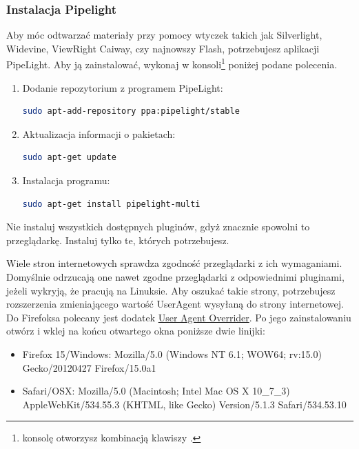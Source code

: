 \subsubsection{Instalacja Pipelight}
Aby móc odtwarzać materiały przy pomocy wtyczek takich jak Silverlight, Widevine, ViewRight Caiway, czy najnowszy Flash, potrzebujesz aplikacji PipeLight. Aby ją zainstalować, wykonaj w konsoli\footnote{konsolę otworzysz kombinacją klawiszy .} poniżej podane polecenia.
\begin{enumerate}
\item Dodanie repozytorium z programem PipeLight:
\begin{lstlisting}[language=bash]
sudo apt-add-repository ppa:pipelight/stable
\end{lstlisting}
\item Aktualizacja informacji o pakietach:
\begin{lstlisting}[language=bash]
sudo apt-get update
\end{lstlisting}
\item Instalacja programu:
\begin{lstlisting}[language=bash]
sudo apt-get install pipelight-multi
\end{lstlisting}
\end{enumerate}

\noindent Nie instaluj wszystkich dostępnych pluginów, gdyż znacznie spowolni to przeglądarkę. Instaluj tylko te, których potrzebujesz.

Wiele stron internetowych sprawdza zgodność przeglądarki z ich wymaganiami. Domyślnie odrzucają one nawet zgodne przeglądarki z odpowiednimi pluginami, jeżeli wykryją, że pracują na Linuksie. Aby oszukać takie strony, potrzebujesz rozszerzenia zmieniającego wartość \textcolor{ubuntu_orange}{UserAgent} wysyłaną do strony internetowej. Do Firefoksa polecany jest dodatek \href{https://addons.mozilla.org/pl-PL/firefox/addon/user-agent-overrider/}{User Agent Overrider}. Po jego zainstalowaniu otwórz  i wklej na końcu otwartego okna poniższe dwie linijki:
\begin{itemize}
\item Firefox 15/Windows: Mozilla/5.0 (Windows NT 6.1; WOW64; rv:15.0) Gecko/20120427 Firefox/15.0a1
\item Safari/OSX: Mozilla/5.0 (Macintosh; Intel Mac OS X 10\_7\_3) AppleWebKit/534.55.3 (KHTML, like Gecko) Version/5.1.3 Safari/534.53.10
\end{itemize}

